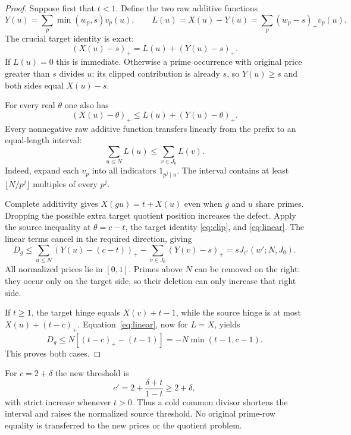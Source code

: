 \documentclass[a4paper,11pt]{article}
\newcommand{\pos}[1]{\left(#1\right)_+}
\begin{document}
\begin{proof}
Suppose first that $t<1$. Define the two raw additive functions
\[
 Y(u)=\sum_p\min(w_p,s)v_p(u),\qquad
 L(u)=X(u)-Y(u)=\sum_p(w_p-s)_+v_p(u).
\]
The crucial target identity is exact:
\begin{equation}\label{eq:clip}
 \pos{X(u)-s}=L(u)+\pos{Y(u)-s}.
\end{equation}
If $L(u)=0$ this is immediate. Otherwise a prime occurrence with original price greater than $s$ divides $u$; its clipped contribution is already $s$, so $Y(u)\ge s$ and both sides equal $X(u)-s$.

For every real $\theta$ one also has
\[
 \pos{X(u)-\theta}\le L(u)+\pos{Y(u)-\theta}.
\]
Every nonnegative raw additive function transfers linearly from the prefix to an equal-length interval:
\begin{equation}\label{eq:linear}
 \sum_{u\le N}L(u)\le\sum_{v\in J_0}L(v).
\end{equation}
Indeed, expand each $v_p$ into all indicators $1_{p^j\mid u}$. The interval contains at least $\lfloor N/p^j\rfloor$ multiples of every $p^j$.

Complete additivity gives $X(gu)=t+X(u)$ even when $g$ and $u$ share primes. Dropping the possible extra target quotient position increases the defect. Apply the source inequality at $\theta=c-t$, the target identity \eqref{eq:clip}, and \eqref{eq:linear}. The linear terms cancel in the required direction, giving
\[
 D_g\le\sum_{u\le N}\pos{Y(u)-(c-t)}
 -\sum_{v\in J_0}\pos{Y(v)-s}
 =sJ_{c'}(w';N,J_0).
\]
All normalized prices lie in $[0,1]$. Primes above $N$ can be removed on the right: they occur only on the target side, so their deletion can only increase that right side.

If $t\ge1$, the target hinge equals $X(v)+t-1$, while the source hinge is at most $X(u)+(t-c)_+$. Equation~\eqref{eq:linear}, now for $L=X$, yields
\[
 D_g\le N[(t-c)_+-(t-1)]=-N\min(t-1,c-1).
\]
This proves both cases.
\end{proof}

For $c=2+\delta$ the new threshold is
\[
 c'=2+\frac{\delta+t}{1-t}\ge2+\delta,
\]
with strict increase whenever $t>0$. Thus a cold common divisor shortens the interval and raises the normalized source threshold. No original prime-row equality is transferred to the new prices or the quotient problem.
\end{document}
